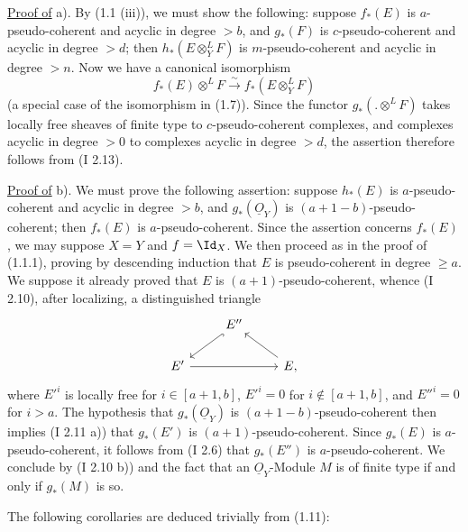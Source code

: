 \uline{Proof of} a). By (1.1 (iii)), we must show the following: suppose \(f_*(E)\) is \(a\)-pseudo-coherent and acyclic in degree \(>b\), and \(g_*(F)\) is \(c\)-pseudo-coherent and acyclic in degree \(>d\); then \(h_*(E\otimes_Y^{L}F)\) is \(m\)-pseudo-coherent and acyclic in degree \(>n\). Now we have a canonical isomorphism
\[
  f_*(E)\otimes^{L}F\xrightarrow{\sim} f_*(E\otimes_Y^{L}F)
\]
(a special case of the isomorphism in (1.7)). Since the functor \(g_*(.\otimes^{L}F)\) takes locally free sheaves of finite type to \(c\)-pseudo-coherent complexes, and complexes acyclic in degree \(>0\) to complexes acyclic in degree \(>d\), the assertion therefore follows from (I 2.13).

\uline{Proof of} b). We must prove the following assertion: suppose \(h_*(E)\) is \(a\)-pseudo-coherent and acyclic in degree \(>b\), and \(g_*(\underline{O}_Y)\) is \((a+1-b)\)-pseudo-coherent; then \(f_*(E)\) is \(a\)-pseudo-coherent. Since the assertion concerns \(f_*(E)\), we may suppose \(X=Y\) and \(f=\Id_X\). We then proceed as in the proof of (1.1.1), proving by descending induction that \(E\) is pseudo-coherent in degree \(\ge a\). We suppose it already proved that \(E\) is \((a+1)\)-pseudo-coherent, whence (I 2.10), after localizing, a distinguished triangle
\[
\begin{tikzcd}
& E'' \arrow[dl,hook] & \\
E' \arrow[rr] & & E \arrow[ul],
\end{tikzcd}
\]
where \(E'^i\) is locally free for \(i\in[a+1,b]\), \(E'^i=0\) for \(i\notin[a+1,b]\), and \(E''^i=0\) for \(i>a\). The hypothesis that \(g_*(\underline{O}_Y)\) is \((a+1-b)\)-pseudo-coherent then implies (I 2.11 a)) that \(g_*(E')\) is \((a+1)\)-pseudo-coherent. Since \(g_*(E)\) is \(a\)-pseudo-coherent, it follows from (I 2.6) that \(g_*(E'')\) is \(a\)-pseudo-coherent. We conclude by (I 2.10 b)) and the fact that an \(\underline{O}_Y\)-Module \(M\) is of finite type if and only if \(g_*(M)\) is so.

The following corollaries are deduced trivially from (1.11):

